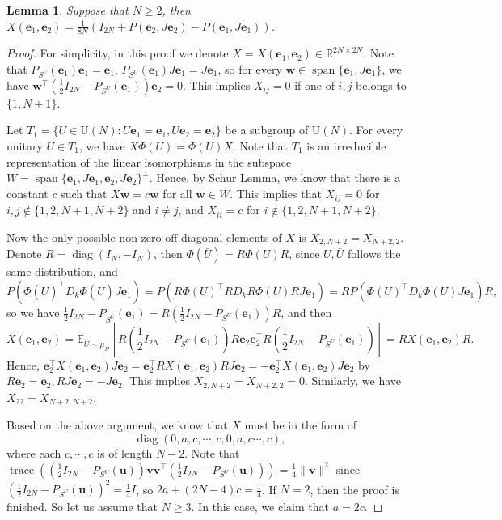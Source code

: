 \documentclass{amsart}
\theoremstyle{plain}
\newtheorem{lemma}{Lemma}
\theoremstyle{definition}
\theoremstyle{remark}
\DeclareMathOperator{\spanop}{span}
\newcommand{\RR}{\mathbb{R}}
\newcommand{\EE}{\mathbb{E}}
\begin{document}
\begin{lemma}
\label{lem:X(e1,e2)}
    Suppose that $N\geq 2$, then $X(\bm e_1,\bm e_2)=\frac{1}{8N}(I_{2N}+P(\bm e_2,J\bm e_2)-P(\bm e_1,J\bm e_1))$.
\end{lemma}
\begin{proof}
    For simplicity, in this proof we denote $X=X(\bm e_1,\bm e_2)\in\RR^{2N\times2N}$.  Note that $P_{S^U}(\bm e_1)\bm e_1=\bm e_1$, $P_{S^U}(\bm e_1)J\bm e_1=J\bm e_1$, so for every $\bm{w}\in \spanop\{\bm e_1,J\bm e_1\}$, we have $\bm{w}^\top(\frac{1}{2}I_{2N}-P_{S^U}(\bm e_1))\bm e_2=0$. This implies $X_{ij}=0$ if one of $i,j$ belongs to $\{1,N+1\}$.
    
    Let $T_1=\{U\in \mathrm U(N):U\bm e_1=\bm e_1,U\bm e_2=\bm e_2\}$ be a subgroup of $\mathrm U(N)$.
    For every unitary $U\in T_1$, we have $X\Phi(U)=\Phi(U)X$. Note that $T_1$ is an irreducible representation of the linear isomorphisms in the subspace $W=\spanop\{\bm e_1,J\bm e_1,\bm e_2,J\bm e_2\}^\perp$. Hence, by Schur Lemma, we know that there is a constant $c$ such that $X\bm{w}=c\bm{w}$ for all $\bm{w}\in W$. This implies that $X_{ij}=0$ for $i,j\notin\{1,2,N+1,N+2\}$ and $i\neq j$, and $X_{ii}=c$ for $i\notin\{1,2,N+1,N+2\}$.

    Now the only possible non-zero off-diagonal elements of $X$ is $X_{2,N+2}=X_{N+2,2}$. Denote $R=\operatorname{diag}(I_N,-I_N)$, then $\Phi(\bar{U})=R\Phi(U)R$, since $U,\bar U$ follows the same distribution, and 
    \[P(\Phi(\bar U)^\top D_k\Phi(\bar U)J\bm e_1)=P(R\Phi(U)^\top RD_kR\Phi(U)RJ\bm e_1)=RP(\Phi(U)^\top D_k\Phi(U)J\bm e_1)R,\]
    so we have $\frac{1}{2}I_{2N}-P_{S^{\bar U}}(\bm e_1)=R(\frac{1}{2}I_{2N}-P_{S^U}(\bm e_1))R$, and then 
    \[X(\bm e_1,\bm e_2)=\EE_{\bar U\sim\mu_H}[R(\frac{1}{2}I_{2N}-P_{S^U}(\bm e_1))R\bm e_2\bm e_2^\top R(\frac{1}{2}I_{2N}-P_{S^U}(\bm e_1))]=RX(\bm e_1,\bm e_2)R.\]
    Hence, $\bm e_2^\top X(\bm e_1,\bm e_2)J\bm e_2=\bm e_2^\top RX(\bm e_1,\bm e_2)RJ\bm e_2=-\bm e_2^\top X(\bm e_1,\bm e_2)J\bm e_2$ by $R\bm e_2=\bm e_2, RJ\bm e_2=-J\bm e_2$. This implies $X_{2,N+2}=X_{N+2,2}=0$. Similarly, we have $X_{22}=X_{N+2,N+2}$.

    Based on the above argument, we know that $X$ must be in the form of \[\operatorname{diag}(0,a,c,\cdots,c,0,a,c\cdots,c),\]
    where each $c,\cdots,c$ is of length $N-2$. Note that $\operatorname{trace}((\frac{1}{2}I_{2N}-P_{S^U}(\bm{u}))\bm{v}\bm{v}^\top(\frac{1}{2}I_{2N}-P_{S^U}(\bm{u})))=\frac{1}{4}\|\bm{v}\|^2$ since $(\frac{1}{2}I_{2N}-P_{S^U}(\bm{u}))^2=\frac{1}{4}I$, so $2a+(2N-4)c=\frac{1}{4}$. If $N=2$, then the proof is finished. So let us assume that $N\geq 3$. In this case, we claim that $a=2c$.  


\end{proof}
\end{document}
